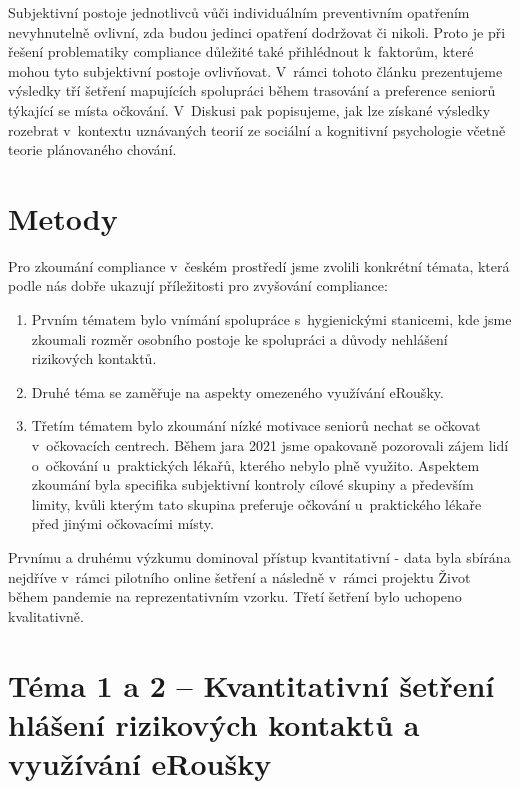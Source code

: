 Subjektivní postoje jednotlivců vůči individuálním preventivním opatřením nevyhnutelně ovlivní, zda budou jedinci opatření dodržovat či nikoli. Proto je při řešení problematiky compliance důležité také přihlédnout k~faktorům, které mohou tyto subjektivní postoje ovlivňovat. V~rámci tohoto článku prezentujeme výsledky tří šetření mapujících spolupráci během trasování a preference seniorů týkající se místa očkování. V~Diskusi pak popisujeme, jak lze získané výsledky rozebrat v~kontextu uznávaných teorií ze sociální a kognitivní psychologie včetně teorie plánovaného chování.

\section*{Metody} 

Pro zkoumání compliance v~českém prostředí jsme zvolili konkrétní témata, která podle nás dobře ukazují příležitosti pro zvyšování compliance: 

\begin{enumerate}
\item Prvním tématem bylo vnímání spolupráce s~hygienickými stanicemi, kde jsme zkoumali rozměr osobního postoje ke spolupráci a důvody nehlášení rizikových kontaktů. 
\item Druhé téma se zaměřuje na aspekty omezeného využívání eRoušky.
\item Třetím tématem bylo zkoumání nízké motivace seniorů nechat se očkovat v~očkovacích centrech. Během jara 2021 jsme opakovaně pozorovali zájem lidí o~očkování u~praktických lékařů, kterého nebylo plně využito. Aspektem zkoumání byla specifika subjektivní kontroly cílové skupiny a především limity, kvůli kterým tato skupina preferuje očkování u~praktického lékaře před jinými očkovacími místy.
\end{enumerate}

Prvnímu a druhému výzkumu dominoval přístup kvantitativní - data byla sbírána nejdříve v~rámci pilotního online šetření a následně v~rámci projektu Život během pandemie na reprezentativním vzorku. Třetí šetření bylo uchopeno kvalitativně.

\section*{Téma 1 a 2 – Kvantitativní šetření hlášení rizikových kontaktů a využívání eRoušky}
